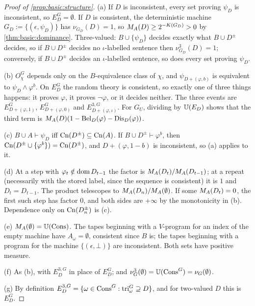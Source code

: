 \begin{proof}[Proof of \cref{prop:basic:structure}]
(a) If $D$ is inconsistent, every set proving $\psi_D$ is inconsistent, so $E^G_D=\emptyset$. If $D$ is consistent, the deterministic machine $G_D:=\{(\epsilon,\psi_D)\}$ has $\nu_{G_D}(D)=1$, so $M_{A}(D)\ge2^{-K(G_D)}>0$ by \cref{thm:basic:dominance}. Three-valued: $B\cup\{\psi_D\}$ decides exactly what $B\cup D^\pm$ decides, so if $B\cup D^\pm$ decides no $\iota$-labelled sentence then $\nu^3_{G_D}(D)=1$; conversely, if $B\cup D^\pm$ decides an $\iota$-labelled sentence, so does every set proving $\psi_D$.

(b) $O^G_\chi$ depends only on the $B$-equivalence class of $\chi$, and $\psi_{D+(\varphi,b)}$ is equivalent to $\psi_D\wedge\varphi^b$. On $E^G_D$ the random theory is consistent, so exactly one of three things happens: it proves $\varphi$, it proves $\neg\varphi$, or it decides neither. The three events are $E^G_{D+(\varphi,1)}$, $E^G_{D+(\varphi,0)}$ and $E^{3,G}_{D+(\varphi,\iota)}$. For $G_U$, dividing by $\mathbb{U}(E_D)$ shows that the third term is $M_{A}(D)(1-\mathrm{Bel}_D(\varphi)-\mathrm{Dis}_D(\varphi))$.

(c) $B\cup A\vdash\psi_D$ iff $\mathrm{Cn}(D^\pm)\subseteq\mathrm{Cn}(A)$. If $B\cup D^\pm\vdash\varphi^b$, then $\mathrm{Cn}(D^\pm\cup\{\varphi^b\})=\mathrm{Cn}(D^\pm)$, and $D+(\varphi,1-b)$ is inconsistent, so (a) applies to it.

(d) At a step with $\varphi_t\notin\operatorname{dom} D_{t-1}$ the factor is $M_{A}(D_t)/M_{A}(D_{t-1})$; at a repeat (necessarily with the stored label, since the sequence is consistent) it is $1$ and $D_t=D_{t-1}$. The product telescopes to $M_{A}(D_n)/M_{A}(\emptyset)$. If some $M_{A}(D_t)=0$, the first such step has factor $0$, and both sides are $+\infty$ by the monotonicity in (b). Dependence only on $\mathrm{Cn}(D_n^\pm)$ is (c).

(e) $M_{A}(\emptyset)=\mathbb{U}(\mathrm{Cons})$. The tapes beginning with a $V$-program for an index of the empty machine have $A_\omega=\emptyset$, consistent since $B$ is; the tapes beginning with a program for the machine $\{(\epsilon,\bot)\}$ are inconsistent. Both sets have positive measure.

(f) As (b), with $E^{3,G}_D$ in place of $E^G_D$; and $\nu^3_G(\emptyset)=\mathbb{U}(\mathrm{Cons}^G)=\nu_G(\emptyset)$.

(g) By definition $E^{3,G}_D=\{\omega\in\mathrm{Cons}^G:\mathrm{tri}^G_\omega\supseteq D\}$, and for two-valued $D$ this is $E^G_D$.
\end{proof}

